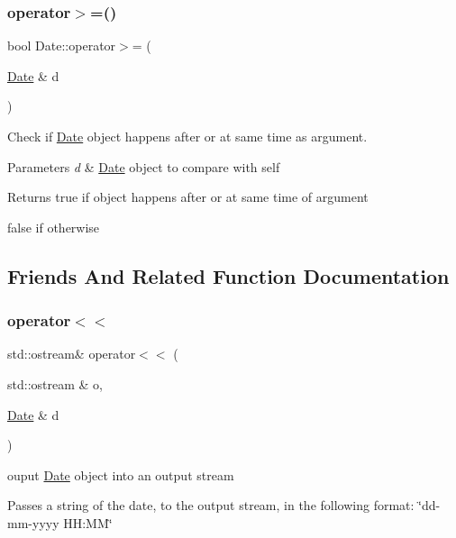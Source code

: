 \subsubsection{\texorpdfstring{operator$>$=()}{operator>=()}}
{\footnotesize\ttfamily bool Date\+::operator$>$= (\begin{DoxyParamCaption}\item[{\mbox{\hyperlink{classDate}{Date}} \&}]{d }\end{DoxyParamCaption})}



Check if \mbox{\hyperlink{classDate}{Date}} object happens after or at same time as argument. 


\begin{DoxyParams}{Parameters}
{\em d} & \mbox{\hyperlink{classDate}{Date}} object to compare with self \\
\hline
\end{DoxyParams}
\begin{DoxyReturn}{Returns}
true if object happens after or at same time of argument 

false if otherwise 
\end{DoxyReturn}


\subsection{Friends And Related Function Documentation}
\mbox{\label{classDate_a2f114c7aa1398dac0f21b888bcb40f3e}} 
\subsubsection{\texorpdfstring{operator$<$$<$}{operator<<}}
{\footnotesize\ttfamily std\+::ostream\& operator$<$$<$ (\begin{DoxyParamCaption}\item[{std\+::ostream \&}]{o,  }\item[{\mbox{\hyperlink{classDate}{Date}} \&}]{d }\end{DoxyParamCaption})\hspace{0.3cm}{\ttfamily [friend]}}



ouput \mbox{\hyperlink{classDate}{Date}} object into an output stream 

Passes a string of the date, to the output stream, in the following format\+: \char`\"{}dd-\/mm-\/yyyy H\+H\+:\+M\+M\char`\"{}


